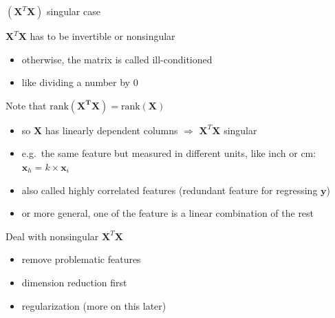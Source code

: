 \documentclass[ignorenonframetext,]{beamer}
\providecommand{\tightlist}{%
  \setlength{\itemsep}{0pt}\setlength{\parskip}{0pt}}
\newcommand{\vv}[1]{\boldsymbol{#1}}
\begin{document}
\begin{frame}{\((\vv{X}^T\vv{X})\) singular case}
\protect\hypertarget{vvxtvvx-singular-case}{}

\(\vv{X}^T\vv{X}\) has to be invertible or nonsingular

\begin{itemize}
\tightlist
\item
  otherwise, the matrix is called ill-conditioned
\item
  like dividing a number by \(0\)
\end{itemize}

\bigskip

Note that \(\text{rank}(\vv{X^TX}) = \text{rank}(\vv{X})\)

\begin{itemize}
\tightlist
\item
  so \(\vv{X}\) has linearly dependent columns \(\Rightarrow\)
  \(\vv{X}^T\vv{X}\) singular
\item
  e.g.~the same feature but measured in different units, like inch or
  cm: \(\vv{x}_h =k\times \vv{x}_i\)
\item
  also called highly correlated features (redundant feature for
  regressing \(\vv{y}\))
\item
  or more general, one of the feature is a linear combination of the
  rest
\end{itemize}

\bigskip

Deal with nonsingular \(\vv{X}^T\vv{X}\)

\begin{itemize}
\tightlist
\item
  remove problematic features
\item
  dimension reduction first
\item
  regularization (more on this later)
\end{itemize}

\end{frame}
\end{document}
